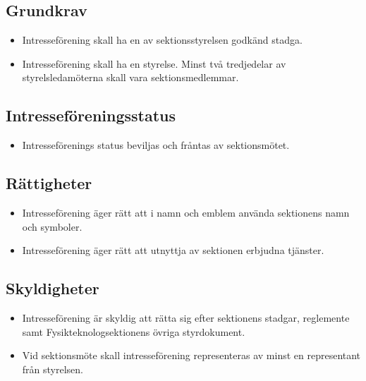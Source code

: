 \documentclass[11pt,a4paper]{article}
\begin{document}
\subsection{Grundkrav}

\begin{itemize}

  \item Intresseförening skall ha en av sektionsstyrelsen godkänd stadga.
  
    \item Intresseförening skall ha en styrelse. Minst två tredjedelar av styrelsledamöterna skall vara sektionsmedlemmar.

\end{itemize}

\subsection{Intresseföreningsstatus}

\begin{itemize}

  \item Intresseförenings status beviljas och fråntas av
  sektionsmötet.

\end{itemize}

\subsection{Rättigheter}

\begin{itemize}

  \item Intresseförening äger rätt att i namn och emblem använda
  sektionens namn och symboler.

  \item Intresseförening äger rätt att utnyttja av sektionen erbjudna
  tjänster.

\end{itemize}

\subsection{Skyldigheter}

\begin{itemize}

  
  \item Intresseförening är skyldig att rätta sig efter sektionens stadgar, reglemente samt Fysikteknologsektionens övriga styrdokument.

  
  \item Vid sektionsmöte skall intresseförening representeras av minst en representant från styrelsen.

\end{itemize}
\end{document}
